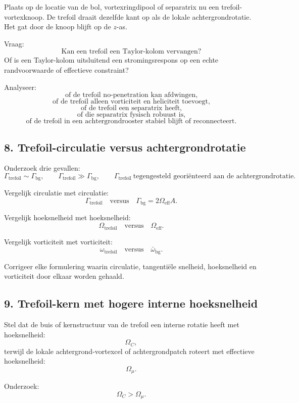\documentclass[11pt,a4paper]{article}
\begin{document}
Plaats op de locatie van de bol, vortexringdipool of separatrix nu een trefoil-vortexknoop. De trefoil draait dezelfde kant op als de lokale achtergrondrotatie. Het gat door de knoop blijft op de \(z\)-as.

Vraag:
\[
\text{Kan een trefoil een Taylor-kolom vervangen?}
\]
Of is een Taylor-kolom uitsluitend een stromingsrespons op een echte randvoorwaarde of effectieve constraint?

Analyseer:
\[
\text{of de trefoil no-penetration kan afdwingen,}
\]
\[
\text{of de trefoil alleen vorticiteit en heliciteit toevoegt,}
\]
\[
\text{of de trefoil een separatrix heeft,}
\]
\[
\text{of die separatrix fysisch robuust is,}
\]
\[
\text{of de trefoil in een achtergrondrooster stabiel blijft of reconnecteert.}
\]

\subsection{8. Trefoil-circulatie versus achtergrondrotatie}

Onderzoek drie gevallen:
\[
\Gamma_{\mathrm{trefoil}}\sim\Gamma_{\mathrm{bg}},
\qquad
\Gamma_{\mathrm{trefoil}}\gg\Gamma_{\mathrm{bg}},
\qquad
\Gamma_{\mathrm{trefoil}}\ \text{tegengesteld georiënteerd aan de achtergrondrotatie}.
\]

Vergelijk circulatie met circulatie:
\[
\Gamma_{\mathrm{trefoil}}
\quad\text{versus}\quad
\Gamma_{\mathrm{bg}}=2\Omega_{\mathrm{eff}}A.
\]

Vergelijk hoeksnelheid met hoeksnelheid:
\[
\Omega_{\mathrm{trefoil}}
\quad\text{versus}\quad
\Omega_{\mathrm{eff}}.
\]

Vergelijk vorticiteit met vorticiteit:
\[
\omega_{\mathrm{trefoil}}
\quad\text{versus}\quad
\bar{\omega}_{\mathrm{bg}}.
\]

Corrigeer elke formulering waarin circulatie, tangentiële snelheid, hoeksnelheid en vorticiteit door elkaar worden gehaald.

\subsection{9. Trefoil-kern met hogere interne hoeksnelheid}

Stel dat de buis of kernstructuur van de trefoil een interne rotatie heeft met hoeksnelheid:
\[
\Omega_C,
\]
terwijl de lokale achtergrond-vortexcel of achtergrondpatch roteert met effectieve hoeksnelheid:
\[
\Omega_{\mu}.
\]

Onderzoek:
\[
\Omega_C>\Omega_{\mu}.
\]
\end{document}
